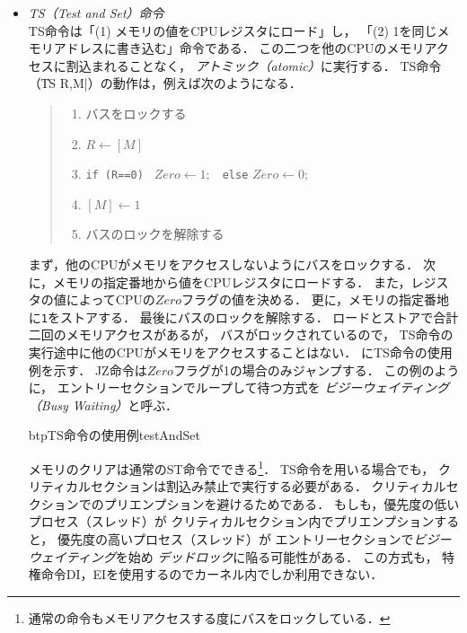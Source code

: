 \begin{itemize}
\item \emph{TS（Test and Set）命令} \\
  TS命令は「(1) メモリの値をCPUレジスタにロード」し，
  「(2) 1を同じメモリアドレスに書き込む」命令である．
  この二つを他のCPUのメモリアクセスに割込まれることなく，
  \emph{アトミック（atomic）}に実行する．
  TS命令（\|TS R,M|）の動作は，例えば次のようになる．

  \begin{quote}
    \begin{enumerate}
    \item バスをロックする
    \item $R \leftarrow [M]$
    \item \texttt{if (R==0) } $Zero \leftarrow 1;$
      \texttt{~else} $Zero \leftarrow 0;$
    \item $[M] \leftarrow 1$
    \item バスのロックを解除する
    \end{enumerate}
  \end{quote}

  まず，他のCPUがメモリをアクセスしないようにバスをロックする．
  次に，メモリの指定番地から値をCPUレジスタにロードする．
  また，レジスタの値によってCPUの$Zero$フラグの値を決める．
  更に，メモリの指定番地に\texttt{1}をストアする．
  最後にバスのロックを解除する．
  ロードとストアで合計二回のメモリアクセスがあるが，
  バスがロックされているので，
  TS命令の実行途中に他のCPUがメモリをアクセスすることはない．
  にTS命令の使用例を示す．
  JZ命令は$Zero$フラグが1の場合のみジャンプする．
  この例のように，
  エントリーセクションでループして待つ方式を
  \emph{ビジーウェイティング（Busy Waiting）}と呼ぶ．

  \begin{myfig}{btp}{TS命令の使用例}{testAndSet}
    
  \end{myfig}

  メモリのクリアは通常のST命令でできる\footnote{
    通常の命令もメモリアクセスする度にバスをロックしている．}．
  TS命令を用いる場合でも，
  クリティカルセクションは割込み禁止で実行する必要がある．
  クリティカルセクションでのプリエンプションを避けるためである．
  もしも，優先度の低いプロセス（スレッド）が
  クリティカルセクション内でプリエンプションすると，
  優先度の高いプロセス（スレッド）が
  エントリーセクションで\emph{ビジーウェイティング}を始め
  \emph{デッドロック}に陥る可能性がある．
  この方式も，
  特権命令DI，EIを使用するのでカーネル内でしか利用できない．


\end{itemize}
